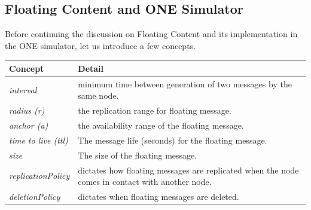 \subsection{Floating Content and ONE Simulator}
Before continuing the discussion on Floating Content and its implementation in the ONE simulator, let us introduce a few concepts.
\begin{center}
     \label{tab:title} 
    \begin{tabular}{ | l | p{11cm} |}
    \hline
    \textbf{Concept} & \textbf{Detail} \\ \hline
    \textit{interval} & minimum time between generation of two messages by the same node. \\ \hline
    \textit{radius (r)} & the replication range for floating message.  \\ \hline
    \textit{anchor (a)} & the availability range of the floating message. \\ \hline
    \textit{time to live (ttl)} & The message life (seconds) for the floating message. \\ \hline
    \textit{size} & The size of the floating message. \\ \hline
    \textit{replicationPolicy} & dictates how floating messages are replicated when the node comes in contact with another node. \\ \hline
    \textit{deletionPolicy} & dictates when floating messages are deleted. \\ \hline
    \end{tabular}
\end{center}
